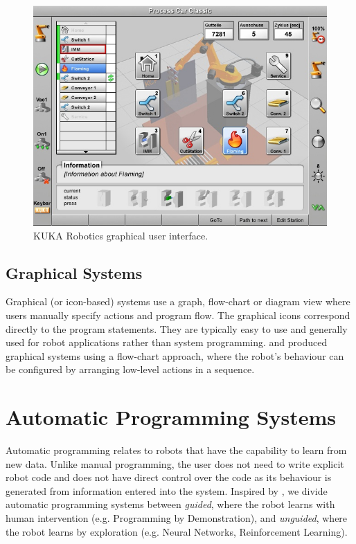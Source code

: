 \begin{figure}[h]
	\centering
	\includegraphics[width=\linewidth]{figures/kuka.jpg}
	\caption{KUKA Robotics graphical user interface. \cite{kuka}}
	\label{fig:Kuka}
\end{figure} 


\subsection{Graphical Systems}\label{sssec:Graphical systems}
Graphical (or icon-based) systems use a graph, flow-chart or diagram view where users manually specify actions and program flow. 
The graphical icons correspond directly to the program statements.
They are typically easy to use and generally used for robot applications rather than system programming. 
\cite{lego2003} and \cite{bischoff2002morpha} produced graphical systems using a flow-chart approach, where the robot's behaviour can be configured by arranging low-level actions in a sequence.


\section{Automatic Programming Systems}\label{subsec:Automatic Programming Systems}
Automatic programming relates to robots that have the capability to learn from new data.
Unlike manual programming, the user does not need to write explicit robot code and does not have direct control over the code as its behaviour is generated from information entered into the system.
Inspired by \cite{Biggs2003}, we divide automatic programming systems between \textit{guided}, where the robot learns with human intervention (e.g. Programming by Demonstration), and \textit{unguided}, where the robot learns by exploration (e.g. Neural Networks, Reinforcement Learning).

